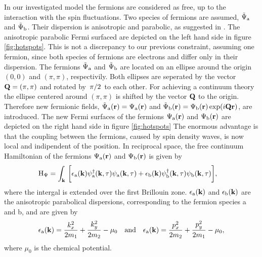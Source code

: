 In our investigated model the fermions are considered as free, up to the interaction with the spin fluctuations.
Two species of fermions are assumed, $\tilde{\Psi}_{\mathrm{a}}$ and $\tilde{\Psi}_{\mathrm{b}}$. 
Their dispersion is anisotropic and parabolic, as suggested in \cite{Patel&Sachdev}. 
The anisotropic parabolic Fermi surfaced are depicted on the left hand side in figure \ref{fig:hotspots}.
This is not a discrepancy to our previous constraint, assuming one fermion, since both species of fermions are electrons and differ only in their dispersion.
The fermions $\tilde{\Psi}_{\mathrm{a}}$ and $\tilde{\Psi}_{\mathrm{b}}$ are located on an ellipse around the origin $(0,0)$ and $(\pi,\pi)$, respectivily.
Both ellipses are seperated by the vector $\vb{Q} = (\pi,\pi)$ and rotated by $\flatfrac{\pi}{2}$ to each other.
For achieving a continuum theory the ellipse centered around $(\pi,\pi)$ is shifted by the vector $\vb{Q}$ to the origin.
Therefore new fermionic fields, $\tilde{\Psi}_{\mathrm{a}}(\vb{r}) = \Psi_{\mathrm{a}}(\vb{r})$ and $\tilde{\Psi}_{\mathrm{b}}(\vb{r}) = \Psi_{\mathrm{b}}(\vb{r}) \exp(i\vb{Q}\vb{r})$, are introduced.
The new Fermi surfaces of the fermions $\Psi_{\mathrm{a}}(\vb{r})$ and $\Psi_{\mathrm{b}}(\vb{r})$ are depicted on the right hand side in figure \ref{fig:hotspots}
The enormous advantage is that the coupling between the fermions, caused by spin density waves, is now local and indipendent of the position.
In reciprocal space, the free continuum Hamiltonian of the fermions $\Psi_{\mathrm{a}}(\vb{r})$ and $\Psi_{\mathrm{b}}(\vb{r})$ is given by
%
\begin{align}
	\mathrm{H}_{\Psi} &= 
	 	\int_{\vb{k}}\,
	 	\bigg[
	 		\epsilon_{\mathrm{a}}(\vb{k})
	 		\psi_{\mathrm{a}}^{\dag}(\vb{k},\tau)
	 		\psi_{\mathrm{a}}(\vb{k},\tau)
	 		+
	 		\epsilon_{\mathrm{b}}(\vb{k})
	 		\psi_{\mathrm{b}}^{\dag}(\vb{k},\tau)
	 		\psi_{\mathrm{b}}(\vb{k},\tau)
	 	\bigg],
	 \label{eq:Hamiltonian electrons}
\end{align}
%
where the intergal is extended over the first Brillouin zone.
$\epsilon_{\mathrm{a}}(\vb{k})$ and $\epsilon_{\mathrm{b}}(\vb{k})$ are the anisotropic parabolical dispersions, corresponding to the fermion species a and b, and are given by
%
\begin{align}
	\epsilon_{\mt{a}}(\vb{k}) = \frac{k_{x}^{2}}{2m_{1}} + \frac{k_{y}^{2}}{2m_{2}} - \mu_{0}
	\qq{and}
	\epsilon_{\mt{a}}(\vb{k}) = \frac{p_{x}^{2}}{2m_{2}} + \frac{p_{y}^{2}}{2m_{1}} - \mu_{0},
	\label{eq:dispersion relations}
\end{align}
%
where $\mu_{0}$ is the chemical potential.
%
%
